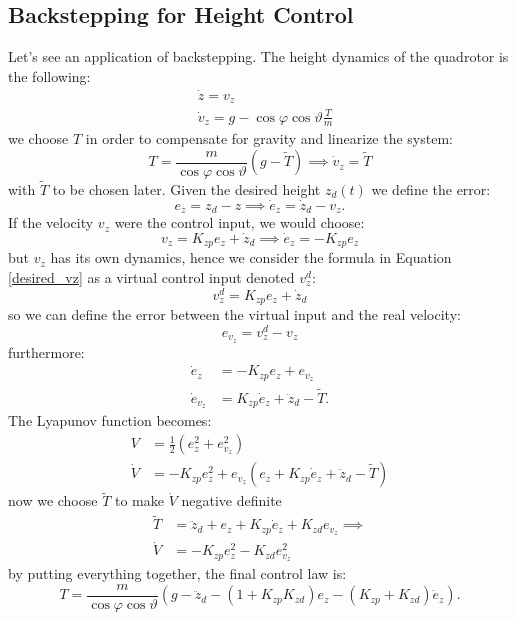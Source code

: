 \documentclass[10pt, a4paper]{report}
\begin{document}
\subsection{Backstepping for Height Control}
Let's see an application of backstepping. The height dynamics of the quadrotor is the following:\begin{align}
    &\dot z = v_z\\ 
    &\dot v_z=g-\cos\varphi\cos\vartheta\frac{T}{m}
\end{align}
we choose $T$ in order to compensate for gravity and linearize the system:\begin{equation}
    T=\frac{m}{\cos\varphi\cos\vartheta}(g-\tilde T)\implies 
    \dot v_z=\tilde T
\end{equation}
with $\tilde T$ to be chosen later.
Given the desired height $z_d(t)$ we define the error:\begin{equation}
    e_z=z_d-z\implies \dot e_z=\dot z_d-v_z.
\end{equation}
If the velocity $v_z$ were the control input, we would choose:\begin{equation}\label{desired_vz}
    v_z=K_{zp}e_z+\dot z_d\implies \dot e_z=-K_{zp}e_z
\end{equation}
but $v_z$ has its own dynamics, hence we consider the formula in Equation \eqref{desired_vz} as a virtual control input denoted $v_z^d$:
\begin{equation}
    v^d_z=K_{zp}e_z+\dot z_d
\end{equation}
so we can define the error between the virtual input and the real velocity:\begin{equation}
     e_{v_z}=v_z^d-v_z
\end{equation}
furthermore:\begin{align}
    \dot e_z&=-K_{zp}e_z+e_{v_z}
    \\\dot e_{v_z}&=K_{zp}\dot e_z+\ddot z_d-\tilde T.
\end{align}
The Lyapunov function becomes:\begin{align}
    V&=\frac{1}{2}(e_z^2+e_{v_z}^2)
    \\\dot V&=-K_{zp}e_z^2+e_{v_z}(
        e_z+K_{zp}\dot e_z+\ddot z_d-\tilde T
    )
\end{align}
now we choose $\tilde T$ to make $\dot V$ negative definite\begin{align}
    \tilde T  &=\ddot z_d+e_z+K_{zp}\dot e_z+K_{zd}e_{v_z}\implies \\ 
    \dot V &= -K_{zp}e_z^2-K_{zd}e_{v_z}^2
\end{align}
by putting everything together, the final control law is:\begin{equation}
    T = \frac{m}{\cos \varphi \cos \vartheta} \left( g - \ddot{z}_d - (1 + K_{zp} K_{zd}) e_z - (K_{zp} + K_{zd}) \dot{e}_z \right).
\end{equation}
\end{document}
